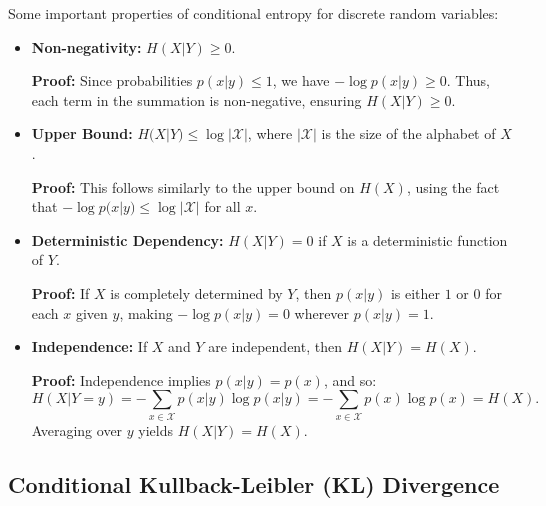 Some important properties of conditional entropy for discrete random variables:

\begin{itemize}
    \item \textbf{Non-negativity:} \( H(X|Y) \geq 0 \).

          \textbf{Proof:} Since probabilities \( p(x|y) \leq 1 \), we have \( -\log p(x|y) \geq 0 \). Thus, each term in the summation is non-negative, ensuring \( H(X|Y) \geq 0 \).

    \item \textbf{Upper Bound:} \( H(X|Y) \leq \log |\mathcal{X}| \), where \( |\mathcal{X}| \) is the size of the alphabet of \( X \).

          \textbf{Proof:} This follows similarly to the upper bound on \( H(X) \), using the fact that \( -\log p(x|y) \leq \log |\mathcal{X}| \) for all \( x \).

    \item \textbf{Deterministic Dependency:} \( H(X|Y) = 0 \) if \( X \) is a deterministic function of \( Y \).

          \textbf{Proof:} If \( X \) is completely determined by \( Y \), then \( p(x|y) \) is either \( 1 \) or \( 0 \) for each \( x \) given \( y \), making \( -\log p(x|y) = 0 \) wherever \( p(x|y) = 1 \).

    \item \textbf{Independence:} If \( X \) and \( Y \) are independent, then \( H(X|Y) = H(X) \).

          \textbf{Proof:} Independence implies \( p(x|y) = p(x) \), and so:
          \[
              H(X|Y = y) = - \sum_{x \in \mathcal{X}}p(x|y)\log p(x|y)= - \sum_{x \in \mathcal{X}} p(x) \log p(x) = H(X).
          \]
          Averaging over \( y \) yields \( H(X|Y) = H(X).\)
\end{itemize}

\subsection{Conditional Kullback-Leibler (KL) Divergence}


